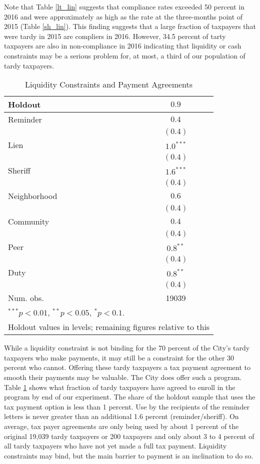 \documentclass[12pt]{article}
\begin{document}
Note that Table \ref{lt_lin} suggests that compliance rates exceeded 50 percent in 2016 and were
approximately as high as the rate at the three-months point of
2015 (Table \ref{sh_lin}). This finding suggests that a large fraction of taxpayers that
were tardy in 2015 are compliers in 2016. However, 34.5 percent of
tarty taxpayers are also in non-compliance in 2016 indicating
that liquidity or cash constraints may be a serious problem for, at
most, a third of our population of tardy taxpayers.

\begin{table}[htbp]
\caption{Liquidity Constraints and Payment Agreements}\label{payment}
\begin{center}
\begin{tabular}{l c}
\hline
Holdout      & $0.9$ \\
\hline
Reminder     & $0.4$     \\
             & $(0.4)$      \\
Lien         & $1.0^{***}$    \\
             & $(0.4)$        \\
Sheriff      & $1.6^{***}$  \\
             & $(0.4)$         \\
Neighborhood & $0.6$        \\
             & $(0.4)$          \\
Community    & $0.4$    \\
             & $(0.4)$         \\
Peer         & $0.8^{**}$  \\
             & $(0.4)$        \\
Duty         & $0.8^{**}$    \\
             & $(0.4)$          \\
\hline
Num. obs.    & 19039            \\
\hline
\multicolumn{2}{l}{$^{***}p<0.01$, $^{**}p<0.05$, $^*p<0.1$. } \\
\multicolumn{2}{l}{Holdout values in levels; remaining figures relative to this}
\end{tabular}
\end{center}
\end{table}

While a liquidity constraint is not binding for the 70 percent of the
City's tardy taxpayers who make payments, it may still be a constraint
for the other 30 percent who cannot.  Offering these tardy taxpayers a
tax payment agreement to smooth their payments may be valuable.  The
City does offer such a program.  Table \ref{payment} shows what
fraction of tardy taxpayers have agreed to enroll in the program by
end of our experiment.  The share of the holdout sample that uses the
tax payment option is less than 1 percent.  Use by the recipients of
the reminder letters is never greater than an additional 1.6 percent
(reminder/sheriff).  On average, tax payer agreements are only being
used by about 1 percent of the original 19,039 tardy taxpayers or 200
taxpayers and only about 3 to 4 percent of all tardy taxpayers who
have not yet made a full tax payment.  Liquidity constraints may bind,
but the main barrier to payment is an inclination to do so.
\end{document}
